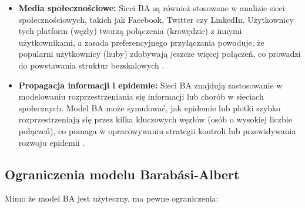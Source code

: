 \begin{itemize}
      \item \textbf{Media społecznościowe:} Sieci BA są również stosowane w analizie sieci społecznościowych, takich jak Facebook, Twitter czy LinkedIn.
            Użytkownicy tych platform (węzły) tworzą połączenia (krawędzie) z innymi użytkownikami, a zasada preferencyjnego przyłączania powoduje, że popularni użytkownicy (huby) zdobywają jeszcze więcej połączeń,
            co prowadzi do powstawania struktur bezskalowych \cite{Leskovec2008}.
            \newpage

      \item \textbf{Propagacja informacji i epidemie:} Sieci BA znajdują zastosowanie w modelowaniu rozprzestrzeniania się informacji lub chorób w sieciach społecznych.
            Model BA może symulować, jak epidemie lub plotki szybko rozprzestrzeniają się przez kilka kluczowych węzłów (osób o wysokiej liczbie połączeń),
            co pomaga w opracowywaniu strategii kontroli lub przewidywania rozwoju epidemii \cite{Pastor2001}.
\end{itemize}

\subsection{Ograniczenia modelu Barabási-Albert}
Mimo że model BA jest użyteczny, ma pewne ograniczenia:

